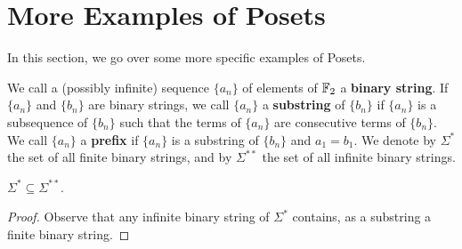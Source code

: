 \section{More Examples of Posets}
\label{section_1.2}

In this section, we go over some more specific examples of Posets.



\begin{definition}
  We call a (possibly infinite) sequence $\{a_n\}$ of elements of
  $\mathbb{F}_2$ a \textbf{binary string}. If $\{a_n\}$ and $\{b_n\}$ are
  binary strings, we call $\{a_n\}$ a \textbf{substring} of $\{b_n\}$
  if $\{a_n\}$ is a subsequence of $\{b_n\}$ such that the terms of
  $\{a_n\}$ are consecutive terms of $\{b_n\}$. We call $\{a_n\}$ a
  \textbf{prefix} if $\{a_n\}$ is a substring of $\{b_n\}$ and $a_1=b_1$.
  We denote by $\Sigma^\ast$ the set of all finite binary strings,
  and by $\Sigma^{\ast\ast}$ the set of all infinite binary strings.
\end{definition}

\begin{lemma}\label{lemma_1.2.1}
  $\Sigma^\ast \subseteq \Sigma^{\ast\ast}$.
\end{lemma}
\begin{proof}
  Observe that any infinite binary string of $\Sigma^\ast$ contains,
  as a substring a finite binary string.
\end{proof}

